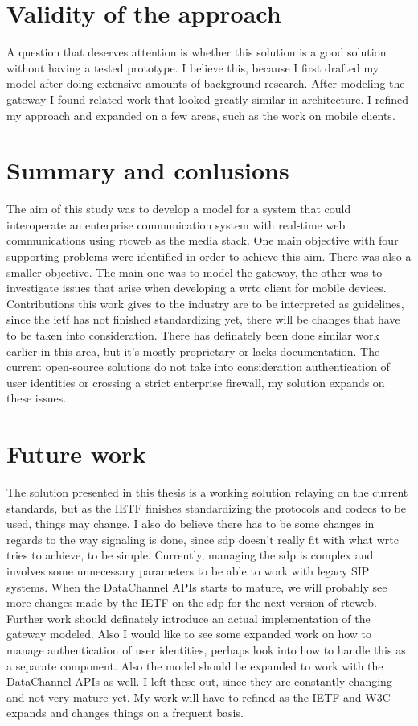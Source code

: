 \section{Validity of the approach}
A question that deserves attention is whether this solution is a good solution without having a tested prototype. I believe this, because I first drafted my model after doing extensive amounts of background research. After modeling the gateway I found related work that looked greatly similar in architecture. I refined my approach and expanded on a few areas, such as the work on mobile clients.

\section{Summary and conlusions}
The aim of this study was to develop a model for a system that could interoperate an enterprise communication system with real-time web communications using \gls{rtcweb} as the media stack. One main objective with four supporting problems were identified in order to achieve this aim. There was also a smaller objective. The main one was to model the gateway, the other was to investigate issues that arise when developing a \gls{wrtc} client for mobile devices. Contributions this work gives to the industry are to be interpreted as guidelines, since the \gls{ietf} has not finished standardizing yet, there will be changes that have to be taken into consideration. There has definately been done similar work earlier in this area, but it's mostly proprietary or lacks documentation. The current open-source solutions do not take into consideration authentication of user identities or crossing a strict enterprise firewall, my solution expands on these issues.

\section{Future work}
The solution presented in this thesis is a working solution relaying on the current standards, but as the IETF finishes standardizing the protocols and codecs to be used, things may change. I also do believe there has to be some changes in regards to the way signaling is done, since \gls{sdp} doesn't really fit with what \gls{wrtc} tries to achieve, to be simple. Currently, managing the \gls{sdp} is complex and involves some unnecessary parameters to be able to work with legacy SIP systems. When the DataChannel APIs starts to mature, we will probably see more changes made by the IETF on the \gls{sdp} for the next version of \gls{rtcweb}. Further work should definately introduce an actual implementation of the gateway modeled. Also I would like to see some expanded work on how to manage authentication of user identities, perhaps look into how to handle this as a separate component. Also the model should be expanded to work with the DataChannel APIs as well. I left these out, since they are constantly changing and not very mature yet. My work will have to refined as the IETF and W3C expands and changes things on a frequent basis.

